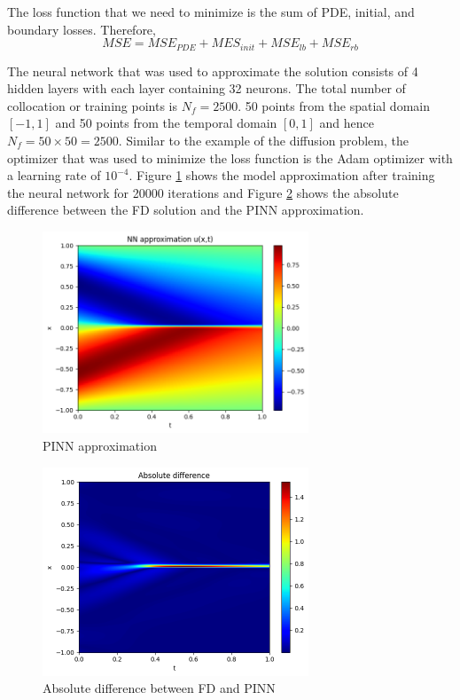 \documentclass[a4paper,12pt]{article}
\theoremstyle{definition}
\begin{document}
The loss function that we need to minimize is the sum of PDE, initial, and boundary losses. Therefore,
\begin{equation}
MSE = MSE_{PDE} + MES_{init} + MSE_{lb} + MSE_{rb}
\end{equation}

The neural network that was used to approximate the solution consists of 4 hidden layers
with each layer containing 32 neurons. The total number of collocation or training points is $N_f=2500$.
50 points from the spatial domain $[-1, 1]$ and 50 points from the temporal domain $[0, 1]$ and hence 
$N_f = 50 \times 50 = 2500$. Similar to the example of the diffusion problem, the optimizer that was used 
to minimize the loss function is the Adam optimizer with a learning rate of $10^{-4}$. Figure \ref{pinn_approx_burgers} 
shows the model approximation after training the neural network for 20000 iterations and Figure \ref{abs_difference_burgers}
shows the absolute difference between the FD solution and the PINN approximation.

\begin{figure}[H]
    \centering 
    \includegraphics[width=300px]{images/NN_burgers_pde.png}
    \vspace{-1em}
    \caption{PINN approximation}
    \label{pinn_approx_burgers}
\end{figure}

\begin{figure}[H]
    \centering 
    \includegraphics[width=300px]{images/abs_difference_burgers.png}
    \vspace{-1em}
    \caption{Absolute difference between FD and PINN}
    \label{abs_difference_burgers}
\end{figure}
\end{document}

